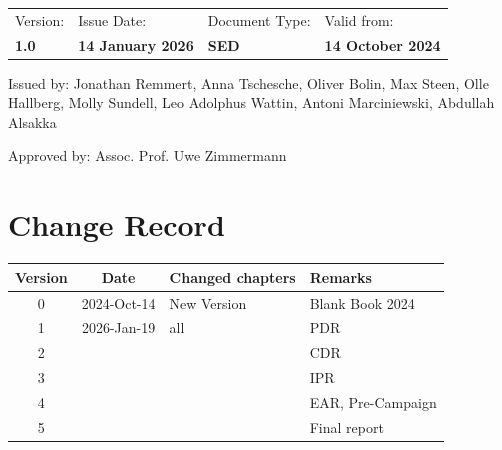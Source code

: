 \documentclass[12pt,a4paper]{report}
\begin{document}
\begin{titlepage}
    \begin{tabular}{llll}
        Version: & Issue Date: & Document Type: & Valid from: \\
        \textbf{1.0} & \textbf{14 January 2026} & \textbf{SED} & \textbf{14 October 2024} 
    \end{tabular}
    
    \vfill
    \vspace{1cm}
    
    Issued by: Jonathan Remmert, Anna Tschesche, Oliver Bolin, Max Steen, Olle Hallberg, Molly Sundell, Leo Adolphus Wattin, Antoni Marciniewski, Abdullah Alsakka \\    %
    
    \vspace{1cm}
    
    Approved by: Assoc. Prof. Uwe Zimmermann\\    %

    \vspace{1cm}    



\end{titlepage}



\chapter*{Change Record}

\begin{table}[h]
\centering
\begin{tabular}{ccp{5cm}p{5cm}}
\toprule
\textbf{Version} & \textbf{Date} & \textbf{Changed chapters} & \textbf{Remarks} \\
\midrule
0 & 2024-Oct-14 & New Version & Blank Book 2024 \\
\rowcolor{lightyellow}
1 & 2026-Jan-19 & all & PDR \\
2 & & & CDR \\
3 & & & IPR \\
4 & & & EAR, Pre-Campaign \\
5 & & & Final report \\
\bottomrule
\end{tabular}
\end{table}
\end{document}
